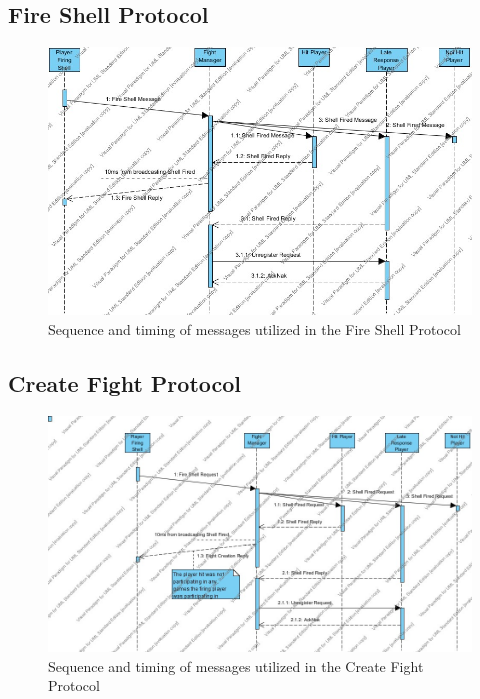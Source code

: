 \documentclass[12pt]{article}
\begin{document}
	\subsection{Fire Shell Protocol}
		\begin{center}
			\begin{figure}[htp]
				\centering
				\includegraphics[width=\textwidth]{Diagrams/Sequence Diagrams/Fire Shell Protocol Sequence.jpg}
				\caption{Sequence and timing of messages utilized in the Fire Shell Protocol}
			\end{figure}
		\end{center}
	\newpage
	\subsection{Create Fight Protocol}
		\begin{center}
			\begin{figure}[htp]
				\centering
				\includegraphics[width=\textwidth]{Diagrams/Sequence Diagrams/Create Fight Protocol Sequence.jpg}
				\caption{Sequence and timing of messages utilized in the Create Fight Protocol}
			\end{figure}
		\end{center}
	\newpage
\end{document}
